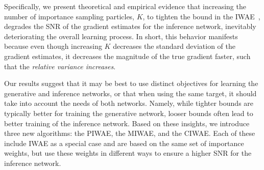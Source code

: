 Specifically, we present theoretical and empirical evidence that increasing the
number of importance sampling particles, $K$, to tighten the bound in the \gls{IWAE}~\citep{Burda2016importance}, degrades the \gls{SNR} of the
gradient estimates for the inference network, inevitably deteriorating the overall learning process.  In short, this behavior manifests because even though increasing
$K$ decreases the standard deviation of the gradient estimates, it decreases
the magnitude of the true gradient faster, such that the \emph{relative variance increases}.
%

Our results suggest that it may be best to use distinct objectives for learning
the generative and inference networks, or that when using the same target, it should
take into account the needs of both networks.
Namely, while tighter bounds are typically better for training
the generative network, looser bounds often lead to better
training of the inference network.
Based on these insights, we introduce three new algorithms: the \gls{PIWAE}, the \gls{MIWAE}, and the \gls{CIWAE}. Each of these include \gls{IWAE} as a special case and are based on the same set of importance weights, 
but use these weights in different ways to ensure a higher SNR for the
inference network.  

